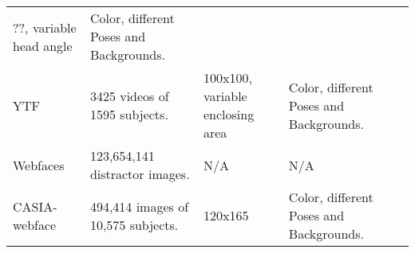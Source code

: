 \documentclass[]{article}
\begin{document}
\begin{longtable}[]{@{}lllll@{}}
\begin{minipage}[t]{0.14\columnwidth}
??, variable head angle\strut
\end{minipage} & \begin{minipage}[t]{0.19\columnwidth}\raggedright
Color, different Poses and Backgrounds.\strut
\end{minipage} & \begin{minipage}[t]{0.20\columnwidth}\raggedright
\autocite{huang2008}\strut
\end{minipage}\tabularnewline
\begin{minipage}[t]{0.09\columnwidth}\raggedright
YTF\strut
\end{minipage} & \begin{minipage}[t]{0.24\columnwidth}\raggedright
3425 videos of 1595 subjects.\strut
\end{minipage} & \begin{minipage}[t]{0.14\columnwidth}\raggedright
100x100, variable enclosing area\strut
\end{minipage} & \begin{minipage}[t]{0.19\columnwidth}\raggedright
Color, different Poses and Backgrounds.\strut
\end{minipage} & \begin{minipage}[t]{0.20\columnwidth}\raggedright
\autocite{wolf2011}\strut
\end{minipage}\tabularnewline
\begin{minipage}[t]{0.09\columnwidth}\raggedright
Webfaces\strut
\end{minipage} & \begin{minipage}[t]{0.24\columnwidth}\raggedright
123,654,141 distractor images.\strut
\end{minipage} & \begin{minipage}[t]{0.14\columnwidth}\raggedright
N/A\strut
\end{minipage} & \begin{minipage}[t]{0.19\columnwidth}\raggedright
N/A\strut
\end{minipage} & \begin{minipage}[t]{0.20\columnwidth}\raggedright
\autocite{otto2018}\strut
\end{minipage}\tabularnewline
\begin{minipage}[t]{0.09\columnwidth}\raggedright
CASIA-webface\strut
\end{minipage} & \begin{minipage}[t]{0.24\columnwidth}\raggedright
494,414 images of 10,575 subjects.\strut
\end{minipage} & \begin{minipage}[t]{0.14\columnwidth}\raggedright
120x165\strut
\end{minipage} & \begin{minipage}[t]{0.19\columnwidth}\raggedright
Color, different Poses and Backgrounds.\strut
\end{minipage} & \begin{minipage}[t]{0.20\columnwidth}\raggedright
\autocite{yi2014}\strut
\end{minipage}\tabularnewline
\bottomrule
\end{longtable}
\end{document}
